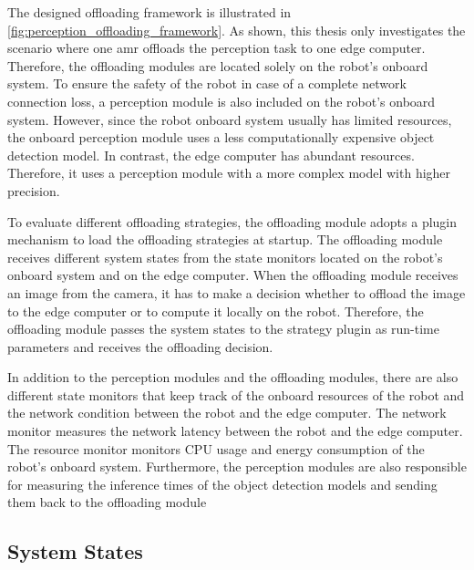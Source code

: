 The designed offloading framework is illustrated in \cref{fig:perception_offloading_framework}. As shown, this thesis only investigates the scenario where one \gls{amr} offloads the perception task to one edge computer. Therefore, the offloading modules are located solely on the robot's onboard system. To ensure the safety of the robot in case of a complete network connection loss, a perception module is also included on the robot's onboard system. However, since the robot onboard system usually has limited resources, the onboard perception module uses a less computationally expensive object detection model. In contrast, the edge computer has abundant resources. Therefore, it uses a perception module with a more complex model with higher precision. 


To evaluate different offloading strategies, the offloading module adopts a plugin mechanism to load the offloading strategies at startup. The offloading module receives different system states from the state monitors located on the robot's onboard system and on the edge computer. When the offloading module receives an image from the camera, it has to make a decision whether to offload the image to the edge computer or to compute it locally on the robot. Therefore, the offloading module passes the system states to the strategy plugin as run-time parameters and receives the offloading decision. 

In addition to the perception modules and the offloading modules, there are also different state monitors that keep track of the onboard resources of the robot and the network condition between the robot and the edge computer. The network monitor measures the network latency between the robot and the edge computer. The resource monitor monitors CPU usage and energy consumption of the robot's onboard system. Furthermore, the perception modules are also responsible for measuring the inference times of the object detection models and sending them back to the offloading module 

\subsection{System States}

